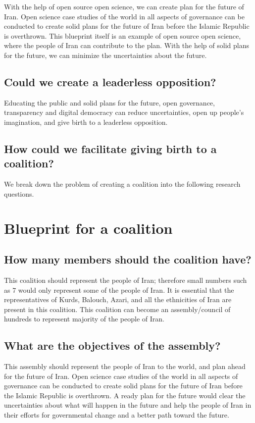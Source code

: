 \documentclass{IEEEtran}
\begin{document}
\begin{enumerate}
With the help of open source open science, we can create plan for the future of Iran.
Open science case studies of the world in all aspects of governance can be conducted to create solid plans for the future of Iran before the Islamic Republic is overthrown.
This blueprint itself is an example of open source open science, where the people of Iran can contribute to the plan.
With the help of solid plans for the future, we can minimize the uncertainties about the future.

\subsection{Could we create a leaderless opposition?}
Educating the public and solid plans for the future,
open governance, transparency and digital democracy can reduce
uncertainties, open up people’s imagination, and give birth to a
leaderless opposition.

\subsection{How could we facilitate giving birth to a coalition?}

We break down the problem of creating a coalition into the following research questions.


\section{Blueprint for a coalition}
\subsection{How many members should the coalition have?}
This coalition should represent the people of Iran; therefore small numbers such as 7 would only represent some of the people of Iran. 
It is essential that the representatives of Kurds, Balouch, Azari, and all the ethnicities of Iran are present in this coalition. This coalition can become an assembly/council of hundreds to represent majority of the people of Iran. 

\subsection{What are the objectives of the assembly?}
This assembly should represent the people of Iran to the world, and plan ahead for the future of Iran.
Open science case studies of the world in all aspects of governance can be conducted to create solid plans for the future of Iran before the Islamic Republic is overthrown.
A ready plan for the future would clear the uncertainties about what will happen in the future and help the people of Iran in their efforts for governmental change and a better path toward the future.


\end{enumerate}
\end{document}
